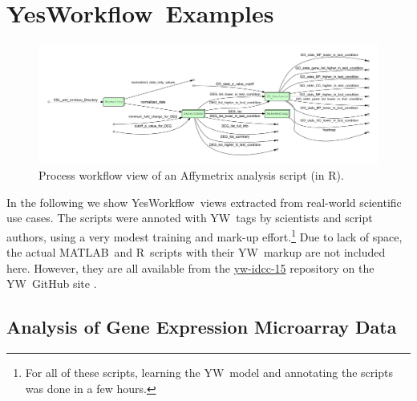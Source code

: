\documentclass{article}
\newcommand{\YW}{\textsf{YesWorkflow}}
\newcommand{\yw}{\textsf{YW}}
\newcommand{\YWT}{\textsf{YesWorkflow}}
\newcommand{\R}{\textsf{R}}
\newcommand{\MATLAB}{\textsf{MATLAB}}
\begin{document}
\section{\YWT\ Examples}

 \begin{figure}[t]
   \centering
   \includegraphics[width=.99\textwidth]{Affymetrix_process_whitebox-crop.pdf}
   \caption{Process workflow view of an
     Affymetrix analysis script (in \R).}
   \label{fig-affymetrics}
 \end{figure}

 In the following we show \YW\ views extracted from real-world
 scientific use cases.  The scripts were annoted with \yw\ tags by
 scientists and script authors, using a very modest training and
 mark-up effort.\footnote{For all of these scripts, learning the \yw\
   model and annotating the scripts was done in a few hours.}  Due to
 lack of space, the actual \MATLAB\ and \R\ scripts with their \yw\
 markup are not included here. However, they are all available from
 the  \href{http://yesworkflow.org/yw-idcc-15}{yw-idcc-15} repository 
on the \yw\ GitHub site \cite{YWgithub2015}.

\subsection{Analysis of Gene Expression Microarray Data}
\end{document}
